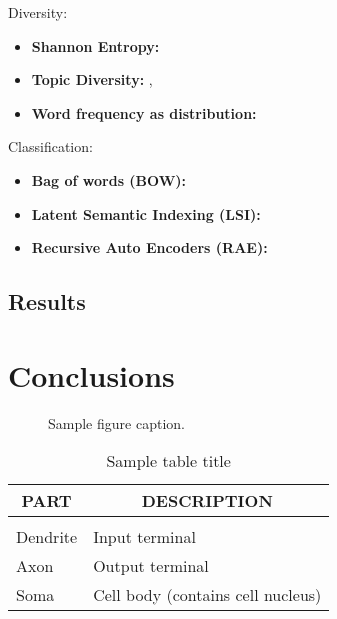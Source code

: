 \documentclass{article} %
\begin{document}
Diversity:
\begin{itemize}
\item {\bf Shannon  Entropy:}
\item{\bf Topic Diversity:} \cite{ganguly:2014}, \cite{bache:2013}
\item{\bf Word frequency as distribution:}
\end{itemize}



Classification:
\begin{itemize}
\item {\bf Bag of words (BOW):}
\item{\bf Latent Semantic Indexing (LSI):}
\item{\bf Recursive Auto Encoders (RAE):}
\end{itemize}

\subsection{Results}
\label{sec:results}



\section{Conclusions}
\label{sec:conclusions}


\begin{figure}[h]
\begin{center}
\fbox{\rule[-.5cm]{0cm}{4cm} \rule[-.5cm]{4cm}{0cm}}
\end{center}
\caption{Sample figure caption.}
\end{figure}



\begin{table}[t]
\caption{Sample table title}
\label{sample-table}
\begin{center}
\begin{tabular}{ll}
\multicolumn{1}{c}{\bf PART}  &\multicolumn{1}{c}{\bf DESCRIPTION}
\\ \hline \\
Dendrite         &Input terminal \\
Axon             &Output terminal \\
Soma             &Cell body (contains cell nucleus) \\
\end{tabular}
\end{center}
\end{table}




\end{document}
